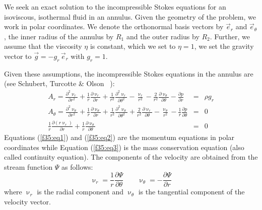 
We seek an exact solution to the incompressible Stokes equations for an isoviscous, isothermal fluid in an  annulus.
Given the geometry of the problem, we work in polar coordinates.
We denote the orthonormal basis vectors by $\vec{e}_r$ and $\vec{e}_\theta$, the inner radius of the annulus by $R_1$ and the outer radius by $R_2$.
Further, we assume that the viscosity $\eta$ is constant, 
which we set to $\eta = 1$, we set the gravity vector to $\vec{g} = -g_r \, \vec{e}_r$ with $g_r = 1$. 

Given these assumptions, the incompressible Stokes equations in the annulus are (see Schubert, Turcotte \& Olson ~\cite{scto01}):
\begin{eqnarray}
A_r =     \frac{\partial^2 \upnu_r}{\partial r^2} + \frac{1}{r} \frac{\partial \upnu_r}{\partial r} +   
      \frac{1}{r^2} \frac{\partial^2 \upnu_r}{\partial \theta^2}
    - \frac{\upnu_r}{r^2} - \frac{2}{r^2} \frac{\partial \upnu_\theta}{\partial \theta} 
-\frac{\partial p}{\partial r}  &=& \rho g_r \label{f35:eq1} \\
A_\theta=
\frac{\partial^2 \upnu_\theta}{\partial r^2} + \frac{1}{r} \frac{\partial \upnu_\theta}{\partial r} + \frac{1}{r^2} \frac{\partial^2 \upnu_\theta}{\partial \theta^2}
+\frac{2}{r^2} \frac{\partial \upnu_r}{\partial \theta} - \frac{\upnu_\theta}{r^2} 
-\frac{1}{r}\frac{\partial p}{\partial \theta} &=& 0
\label{f35:eq2} \\
\frac{1}{r} \frac{\partial (r\upnu_r)}{\partial r} + \frac{1}{r} \frac{\partial \upnu_\theta}{\partial \theta} &=&0 \label{f35:eq3}
\end{eqnarray}
Equations (\ref{f35:eq1}) and (\ref{f35:eq2}) are the momentum equations in polar coordinates while
Equation (\ref{f35:eq3}) is the mass conservation equation (also called continuity equation).
The components of the velocity are obtained from the stream function $\Psi$ as follows:
\[
\upnu_r = \frac{1}{r}\frac{\partial \Psi}{\partial \theta}
\quad\quad
\upnu_\theta = - \frac{\partial \Psi}{\partial r}
\]
where $\upnu_r$ is the radial component and $\upnu_\theta$ is the tangential component of the velocity vector.

